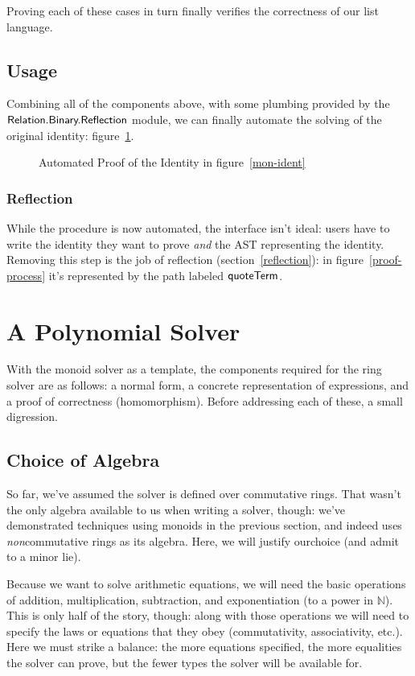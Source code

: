 \documentclass[draft, twocolumn]{article}
\theoremstyle{definition}
\theoremstyle{definition}
\begin{document}
Proving each of these cases in turn finally verifies the correctness of our list
language.
\subsection{Usage}
Combining all of the components above, with some plumbing provided by the
\(\AgdaModule{Relation.Binary.Reflection}\) module, we can finally automate the
solving of the original identity: figure~\ref{mon-auto-proof}.
\begin{figure}
  \caption{Automated Proof of the Identity in figure~\ref{mon-ident}}
  \label{mon-auto-proof}
\end{figure}
\subsubsection{Reflection}
While the procedure is now automated, the interface isn't ideal: users have to
write the identity they want to prove \emph{and} the AST representing the
identity. Removing this step is the job of reflection
(section~\ref{reflection}): in figure~\ref{proof-process} it's represented by
the path labeled \(\AgdaKeyword{quoteTerm}\).
\section{A Polynomial Solver}
With the monoid solver as a template, the components required for the ring
solver are as follows: a normal form, a concrete representation of
expressions, and a proof of correctness (homomorphism). Before addressing each
of these, a small digression.
\subsection{Choice of Algebra}
So far, we've assumed the solver is defined over commutative rings. That wasn't
the only algebra available to us when writing a solver, though: we've
demonstrated techniques using monoids in the previous section, and
indeed\cite{geuvers_automatically_2017} uses \emph{non}commutative rings as its
algebra. Here, we will justify our\footnotemark choice (and admit to a minor lie).

Because we want to solve arithmetic equations, we will need the basic operations
of addition, multiplication, subtraction, and exponentiation (to a power in
\(\mathbb{N}\)). This is only half of the story, though: along with those
operations we will need to specify the laws or equations that they obey
(commutativity, associativity, etc.). Here we must strike a balance: the more
equations specified, the more equalities the solver can prove, but the fewer
types the solver will be available for.
\end{document}
